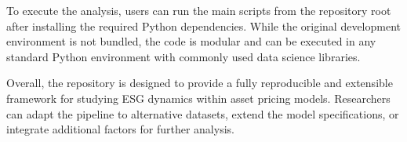 To execute the analysis, users can run the main scripts from the repository root after installing the required Python dependencies. While the original development environment is not bundled, the code is modular and can be executed in any standard Python environment with commonly used data science libraries.

Overall, the repository is designed to provide a fully reproducible and extensible framework for studying ESG dynamics within asset pricing models. Researchers can adapt the pipeline to alternative datasets, extend the model specifications, or integrate additional factors for further analysis.
